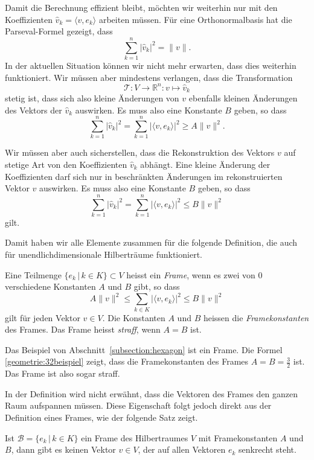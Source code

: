 Damit die Berechnung effizient bleibt, möchten wir weiterhin nur mit den
Koeffizienten $\hat{v}_k = \langle v,e_k\rangle$ arbeiten müssen.
Für eine Orthonormalbasis hat die Parseval-Formel gezeigt, dass
\[
\sum_{k=1}^n |\hat{v}_k|^2 = \| v \|.
\]
In der aktuellen Situation können wir nicht mehr erwarten, dass dies 
weiterhin funktioniert.
Wir müssen aber mindestens verlangen, dass die Transformation
\[
\mathcal{T}
\colon
V\to \mathbb R^n
:
v\mapsto \hat{v}_k
\]
stetig ist, dass sich also kleine Änderungen von $v$ ebenfalls
kleinen Änderungen des Vektors der $\hat{v}_k$ auswirken.
Es muss also eine Konstante $B$ geben, so dass
\[
\sum_{k=1}^n |\hat{v}_k|^2
=
\sum_{k=1}^n |\langle v,e_k\rangle|^2
\ge
A \| v \|^2.
\]

Wir müssen aber auch sicherstellen, dass die Rekonstruktion des Vektors $v$
auf stetige Art von den Koeffizienten $\hat{v}_k$ abhängt. 
Eine kleine Änderung der Koeffizienten darf sich nur in beschränkten Änderungen
im rekonstruierten Vektor $v$ auswirken.
Es muss also eine Konstante $B$ geben, so dass
\[
\sum_{k=1}^n |\hat{v}_k|^2
=
\sum_{k=1}^n |\langle v,e_k\rangle|^2
\le
B \| v \|^2
\]
gilt.

Damit haben wir alle Elemente zusammen für die folgende Definition,
die auch für unendlichdimensionale Hilberträume funktioniert.

\begin{definition}
\label{definition:frame}
Eine Teilmenge $\{ e_k\,|\, k\in K\}\subset V$ heisst ein {\em Frame},
wenn es zwei von $0$ verschiedene Konstanten $A$ und $B$ gibt, so dass
\[
A\|v\|^2 \le \sum_{k\in K} |\langle v, e_k\rangle|^2 \le B \| v\|^2
\]
gilt für jeden Vektor $v\in V$.
Die Konstanten $A$ und $B$ heissen die {\em Framekonstanten} des Frames.
Das Frame heisst {\em straff}, wenn $A=B$ ist.
\end{definition}

\begin{beispiel}
Das Beispiel von Abschnitt~\ref{subsection:hexagon} ist ein Frame.
Die Formel \eqref{geometrie:32beispiel} zeigt, dass die Framekonstanten
des Frames $A=B=\frac32$ ist.
Das Frame ist also sogar straff.
\end{beispiel}

In der Definition wird nicht erwähnt, dass die Vektoren des Frames den
ganzen Raum aufspannen müssen.
Diese Eigenschaft folgt jedoch direkt aus der Definition eines Frames,
wie der folgende Satz zeigt.

\begin{satz}
Ist $\mathcal{B}=\{ e_k\,|\, k\in K\}$ ein Frame des Hilbertraumes $V$
mit Framekonstanten $A$ und $B$, dann gibt es keinen Vektor $v\in V$,
der auf allen Vektoren $e_k$ senkrecht steht.
\end{satz}

